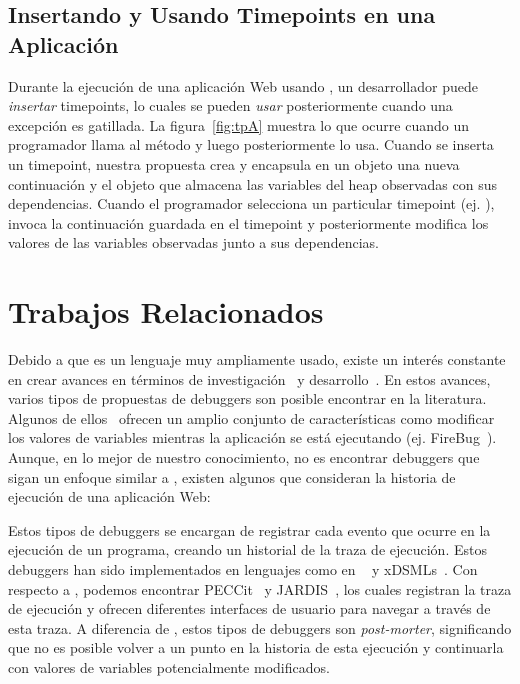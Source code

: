 \documentclass[conference]{IEEEtran}
\begin{document}
\subsection{Insertando y Usando Timepoints en una Aplicaci\'on}
\label{sec:utime}

Durante la ejecuci\'on de una aplicaci\'on Web usando \deloreanjs, un desarrollador puede {\em insertar} timepoints, lo cuales se pueden {\em usar} posteriormente cuando una excepci\'on es gatillada. La figura~\ref{fig:tpA} muestra lo que ocurre cuando un programador llama al m\'etodo  y luego posteriormente lo usa. Cuando se inserta un timepoint, nuestra propuesta crea y encapsula en un objeto  una nueva continuaci\'on y el objeto que almacena las variables del heap observadas con sus dependencias. Cuando el programador selecciona un particular timepoint (ej. ), \deloreanjs invoca la continuaci\'on guardada en el timepoint y posteriormente modifica los valores de las variables observadas junto a sus dependencias.   
 
\section{Trabajos Relacionados}
\label{sec:rw}

Debido a que \javascript es un lenguaje muy ampliamente usado, existe un inter\'es constante en crear avances en t\'erminos de investigaci\'on~\cite{vazquesAl:ist2018,legerAl:scp2013,legerAl:scp2015,zhengAl:www2011,chargueraudAl:www2018} y desarrollo~\cite{resig:jquery,angular,mckenzie:babel,rxjs}. En estos avances, varios tipos de propuestas de debuggers son posible encontrar en la literatura. Algunos de ellos~\cite{bartonOdvarko:www2011,jsbin,nodejsInspector} ofrecen un amplio conjunto de caracter\'isticas como modificar los valores de variables mientras la aplicaci\'on se est\'a ejecutando (ej. FireBug~\cite{bartonOdvarko:www2011}). Aunque, en lo mejor de nuestro conocimiento, no es encontrar debuggers que sigan un enfoque similar a \deloreanjs, existen algunos que consideran la historia de ejecuci\'on de una aplicaci\'on Web:       

\smallskip

 Estos tipos de debuggers se encargan de registrar cada evento que ocurre en la ejecuci\'on de un programa, creando un historial de la traza de ejecuci\'on. Estos debuggers han sido implementados en lenguajes como en \java~\cite{tod:oopsla2007} y xDSMLs~\cite{bousseAl:SLE2015}. Con respecto a  \javascript, podemos encontrar PECCit~\cite{azar:2016} y JARDIS~\cite{barrAl:fse2016}, los cuales registran la traza de ejecuci\'on y ofrecen diferentes interfaces de usuario para navegar a trav\'es de esta traza. A diferencia de \deloreanjs, estos tipos de debuggers son {\em post-morter}, significando que no es posible volver a un punto en la historia de esta ejecuci\'on y continuarla con valores de variables potencialmente modificados. 
\end{document}
